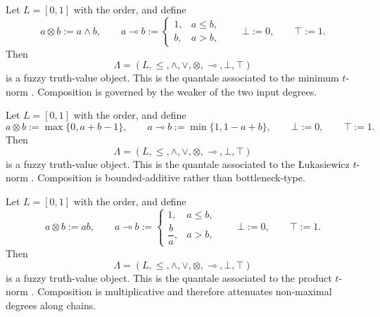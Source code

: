 \begin{example}\label{ex:godel-quantale}
    Let \(L=[0,1]\) with the order, and define
    \[
        a\otimes b:=a\wedge b,
        \qquad
        a\multimap b:=
        \begin{cases}
            1,&a\leq b,\\
            b,&a>b,
        \end{cases}
        \qquad
        \bot:=0,
        \qquad
        \top:=1.
    \]
    Then
    \[
        \Lambda=(L,\leq,\wedge,\vee,\otimes,\multimap,\bot,\top)
    \]
    is a fuzzy truth-value object. This is the quantale associated to the minimum \(t\)-norm \cite[Example~2.4]{stubbe-2014-quantaloid-enriched}. Composition is governed by the weaker of the two input degrees.
\end{example}

\begin{example}
\label{ex:lukasiewicz-quantale}
    Let \(L=[0,1]\) with the order, and define
    \[
        a\otimes b:=\max\{0,a+b-1\},
        \qquad
        a\multimap b:=\min\{1,1-a+b\},
        \qquad
        \bot:=0,
        \qquad
        \top:=1.
    \]
    Then
    \[
        \Lambda=(L,\leq,\wedge,\vee,\otimes,\multimap,\bot,\top)
    \]
    is a fuzzy truth-value object. This is the quantale associated to the
    {\L}ukasiewicz \(t\)-norm \cite[Example~2.4]{stubbe-2014-quantaloid-enriched}. Composition is bounded-additive rather than bottleneck-type.
\end{example}

\begin{example}\label{ex:product-quantale}
    Let \(L=[0,1]\) with the order, and define
    \[
        a\otimes b:=ab,
        \qquad
        a\multimap b:=
        \begin{cases}
            1,&a\leq b,\\[1mm]
            \dfrac{b}{a},&a>b,
        \end{cases}
        \qquad
        \bot:=0,
        \qquad
        \top:=1.
    \]
    Then
    \[
        \Lambda=(L,\leq,\wedge,\vee,\otimes,\multimap,\bot,\top)
    \]
    is a fuzzy truth-value object. This is the quantale associated to the product \(t\)-norm \cite[Example~2.4]{stubbe-2014-quantaloid-enriched}. Composition is
    multiplicative and therefore attenuates non-maximal degrees along chains.
\end{example}

